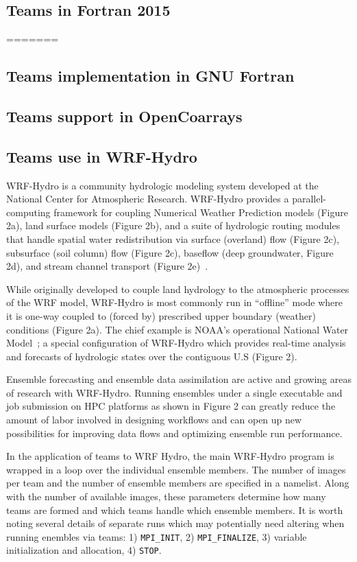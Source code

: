 \subsection{Teams in Fortran 2015}\label{teams-in-fortran-2015}
=======
\subsection{Teams implementation in GNU Fortran}
\subsection{Teams support in OpenCoarrays}
\subsection{Teams use in WRF-Hydro}

WRF-Hydro is a community hydrologic modeling system developed at the
National Center for Atmospheric Research.  WRF-Hydro provides a
parallel-computing framework for coupling Numerical Weather Prediction
models (Figure 2a), land surface models (Figure 2b), and a suite of hydrologic routing modules that handle
spatial water redistribution via surface (overland) flow (Figure 2c),
subsurface (soil column) flow (Figure 2c), baseflow (deep groundwater,
Figure 2d), and stream
channel transport (Figure 2e)~\cite{gochisEtal}. 

While originally developed to couple land hydrology to the atmospheric processes of
the WRF model, WRF-Hydro is most commonly run in ``offline'' mode where it is one-way
coupled to (forced by) prescribed upper boundary (weather)
conditions (Figure 2a). The chief example is NOAA's operational
National Water Model~\cite{noaa2016}; a special configuration of
WRF-Hydro which provides real-time analysis and forecasts of
hydrologic states over the contiguous U.S (Figure 2). 

Ensemble forecasting and ensemble data assimilation are active and
growing areas of research with WRF-Hydro. Running ensembles under a
single executable and job submission on HPC platforms as shown in
Figure 2 can greatly reduce the amount
of labor involved in designing workflows and can open up new
possibilities for improving data flows and optimizing ensemble run
performance.

In the application of teams to WRF Hydro, the main WRF-Hydro program is wrapped in a loop
over the individual ensemble members. The number of images per team and the
 number of ensemble members are specified in a namelist. Along with
 the number of available images, these parameters determine how many
 teams are formed and which teams handle which ensemble members. It is
 worth noting several details of separate runs which may potentially need altering
 when running enembles via teams: 1) \texttt{MPI\_INIT}, 2) \texttt{MPI\_FINALIZE}, 3)
 variable initialization and allocation, 4) \texttt{STOP}.   
 

